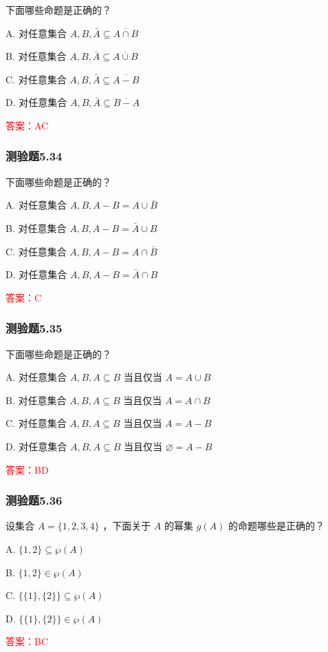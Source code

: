 \documentclass[UTF8, heading=true]{ctexart}
\begin{document}
下面哪些命题是正确的？

A. 对任意集合 $A, B, \bar{A} \subseteq \overline{A \cap B}$

B. 对任意集合 $A, B, \bar{A} \subseteq \overline{A \cup B}$

C. 对任意集合 $A, B, \bar{A} \subseteq \overline{A-B}$

D. 对任意集合 $A, B, \bar{A} \subseteq \overline{B-A}$

\textcolor{red}{答案：AC}

\subsubsection{测验题5.34}
下面哪些命题是正确的？

A. 
对任意集合 $A, B, A-B=A \cup \bar{B}$

B. 对任意集合 $A, B, A-B=\bar{A} \cup B$

C. 对任意集合 $A, B, A-B=A \cap \bar{B}$

D. 对任意集合 $A, B, A-B=\bar{A} \cap B$

\textcolor{red}{答案：C}


\subsubsection{测验题5.35}
下面哪些命题是正确的？

A. 对任意集合 $A, B, A \subseteq B$ 当且仅当 $A=A \cup B$

B. 对任意集合 $A, B, A \subseteq B$ 当且仅当 $A=A \cap B$

C. 对任意集合 $A, B, A \subseteq B$ 当且仅当 $A=A-B$

D. 对任意集合 $A, B, A \subseteq B$ 当且仅当 $\varnothing=A-B$

\textcolor{red}{答案：BD}

\subsubsection{测验题5.36}

设集合 $A=\{1,2,3,4\}$ ，下面关于 $A$ 的幂集 $g(A)$ 的命题哪些是正确的？


A. $\{1,2\} \subseteq \wp(A) $

B. $\{1,2\} \in \wp(A) $

C. $\{\{1\},\{2\}\} \subseteq \wp(A) $

D. $\{\{1\},\{2\}\} \in \wp(A)$

\textcolor{red}{答案：BC}
\end{document}
